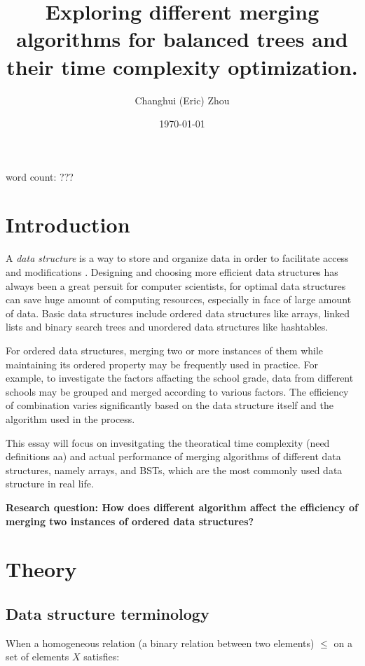 \documentclass[12pt]{article}
\title{\textbf{Exploring different merging algorithms for balanced trees and their time complexity optimization.}}
\author{Changhui (Eric) Zhou}
\date{\today}
\begin{document}
\begin{titlepage}
    \maketitle
    \centering word count: ???
\end{titlepage}

\tableofcontents
\clearpage

\section{Introduction}

A \textit{data structure} is a way to store and organize data in order to facilitate access and modifications \cite{ItA}. Designing and choosing more efficient data structures has always been a great persuit for computer scientists, for optimal data structures can save huge amount of computing resources, especially in face of large amount of data. Basic data structures include ordered data structures like arrays, linked lists and binary search trees and unordered data structures like hashtables. 

For ordered data structures, merging two or more instances of them while maintaining its ordered property may be frequently used in practice. For example, to investigate the factors affacting the school grade, data from different schools may be grouped and merged according to various factors. The efficiency of combination varies significantly based on the data structure itself and the algorithm used in the process. 

This essay will focus on invesitgating the theoratical time complexity (need definitions aa) and actual performance of merging algorithms of different data structures, namely arrays, and BSTs, which are the most commonly used data structure in real life. 

\textbf{Research question: How does different algorithm affect the efficiency of merging two instances of ordered data structures?}

\section{Theory}

\subsection{Data structure terminology}

When a homogeneous relation (a binary relation between two elements) $\le$ on a set of elements $X$ satisfies:
\end{document}
